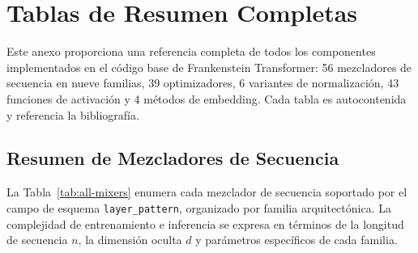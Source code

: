 \section{Tablas de Resumen Completas}
\label{sec:annex-summary-tables}

Este anexo proporciona una referencia completa de todos los componentes implementados en el código base de Frankenstein Transformer: 56 mezcladores de secuencia en nueve familias, 39 optimizadores, 6 variantes de normalización, 43 funciones de activación y 4 métodos de embedding. Cada tabla es autocontenida y referencia la bibliografía.

\subsection{Resumen de Mezcladores de Secuencia}

La Tabla~\ref{tab:all-mixers} enumera cada mezclador de secuencia soportado por el campo de esquema \texttt{layer\_pattern}, organizado por familia arquitectónica. La complejidad de entrenamiento e inferencia se expresa en términos de la longitud de secuencia $n$, la dimensión oculta $d$ y parámetros específicos de cada familia.

